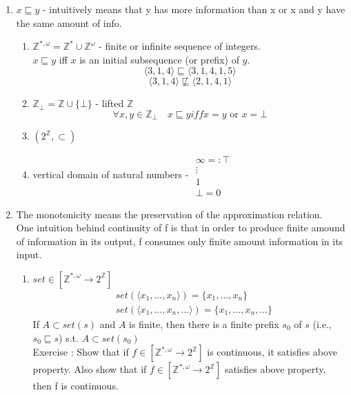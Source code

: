 \documentclass{report}[12pt]
\begin{document}
\begin{enumerate}
    \item $x \sqsubseteq y$ - intuitively means that y has more information than x or x and y have the same amount of info.
    \begin{enumerate}
        \item $\mathbb{Z}^{*, \omega} = \mathbb{Z}^* \cup \mathbb{Z}^\omega$ - finite or infinite sequence of integers. \\
        $x\sqsubseteq y$ iff $x$ is an initial subsequence (or prefix) of $y$.
        \[\langle 3, 1, 4 \rangle \sqsubseteq \langle 3, 1, 4, 1, 5 \rangle\]
        \[\langle 3, 1, 4 \rangle \not\sqsubseteq \langle 2, 1, 4, 1 \rangle\]
        \item $\mathbb{Z}_\bot=\mathbb{Z}\cup \{\bot\}$ - lifted $\mathbb{Z}$ \\
        \[\forall x, y \in \mathbb{Z}_\bot \quad x\sqsubseteq y iff x=y \text{ or }x=\bot\]
        \item $(2^{\mathbb{Z}}, \subset)$
        \item vertical domain of natural numbers - $\begin{array}{c}\infty=:\top \\\vdots \\ 1 \\ \bot=0\end{array}$
    \end{enumerate}
    \item The monotonicity means the preservation of the approximation relation. \\
    One intuition behind continuity of f is that in order to produce finite amound of information in its output, f consumes only finite amount information in its input.
    \begin{enumerate}
        \item $set \in [\mathbb{Z}^{*, \omega}\rightarrow 2^{\mathbb{Z}}]$ \\
        \begin{align*}
            &set(\langle x_1, \ldots, x_n \rangle) = \{x_1, \ldots, x_n\} \\
            &set(\langle x_1, \ldots, x_n, \ldots \rangle) = \{x_1, \ldots, x_n, \ldots\}
        \end{align*}
        If $A \subset set(s)$ and $A$ is finite, then there is a finite prefix $s_0$ of $s$ (i.e., $s_0 \sqsubseteq s$) s.t. $A \subset set(s_0)$ \\
        Exercise : Show that if $f\in [\mathbb{Z}^{*, \omega} \rightarrow 2^{\mathbb{Z}}]$ is continuous, it satisfies above property. Also show that if $f\in [\mathbb{Z}^{*, \omega} \rightarrow 2^{\mathbb{Z}}]$ satisfies above property, then f is continuous.

\end{enumerate}
\end{enumerate}
\end{document}
